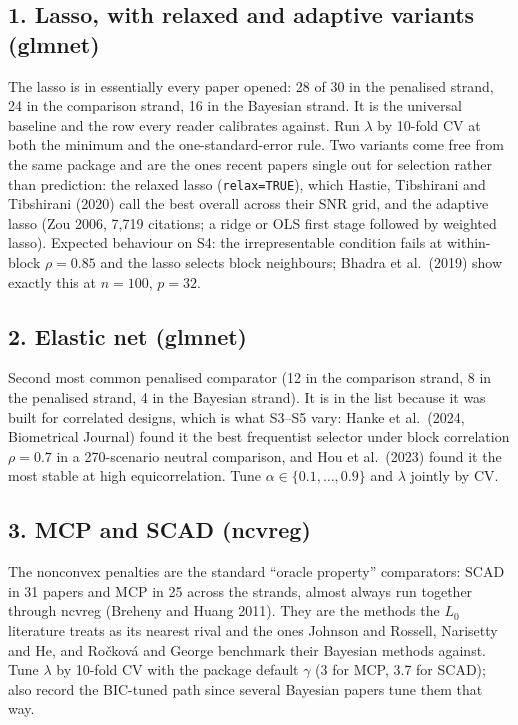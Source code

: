 \documentclass[11pt,letterpaper]{article}
\newcommand{\code}[1]{\texttt{#1}}
\newcommand{\pkg}[1]{\textsf{#1}}
\begin{document}
\subsection*{1. Lasso, with relaxed and adaptive variants (\pkg{glmnet})}
The lasso is in essentially every paper opened: 28 of 30 in the penalised strand, 24 in the comparison strand, 16 in the Bayesian strand. It is the universal baseline and the row every reader calibrates against. Run $\lambda$ by 10-fold CV at both the minimum and the one-standard-error rule. Two variants come free from the same package and are the ones recent papers single out for selection rather than prediction: the relaxed lasso (\code{relax=TRUE}), which Hastie, Tibshirani and Tibshirani (2020) call the best overall across their SNR grid, and the adaptive lasso (Zou 2006, 7{,}719 citations; a ridge or OLS first stage followed by weighted lasso). Expected behaviour on S4: the irrepresentable condition fails at within-block $\rho=0.85$ and the lasso selects block neighbours; Bhadra et al.\ (2019) show exactly this at $n=100$, $p=32$.

\subsection*{2. Elastic net (\pkg{glmnet})}
Second most common penalised comparator (12 in the comparison strand, 8 in the penalised strand, 4 in the Bayesian strand). It is in the list because it was built for correlated designs, which is what S3--S5 vary: Hanke et al.\ (2024, Biometrical Journal) found it the best frequentist selector under block correlation $\rho=0.7$ in a 270-scenario neutral comparison, and Hou et al.\ (2023) found it the most stable at high equicorrelation. Tune $\alpha\in\{0.1,\dots,0.9\}$ and $\lambda$ jointly by CV.

\subsection*{3. MCP and SCAD (\pkg{ncvreg})}
The nonconvex penalties are the standard ``oracle property'' comparators: SCAD in 31 papers and MCP in 25 across the strands, almost always run together through \pkg{ncvreg} (Breheny and Huang 2011). They are the methods the $L_0$ literature treats as its nearest rival and the ones Johnson and Rossell, Narisetty and He, and Ročková and George benchmark their Bayesian methods against. Tune $\lambda$ by 10-fold CV with the package default $\gamma$ (3 for MCP, 3.7 for SCAD); also record the BIC-tuned path since several Bayesian papers tune them that way.
\end{document}
